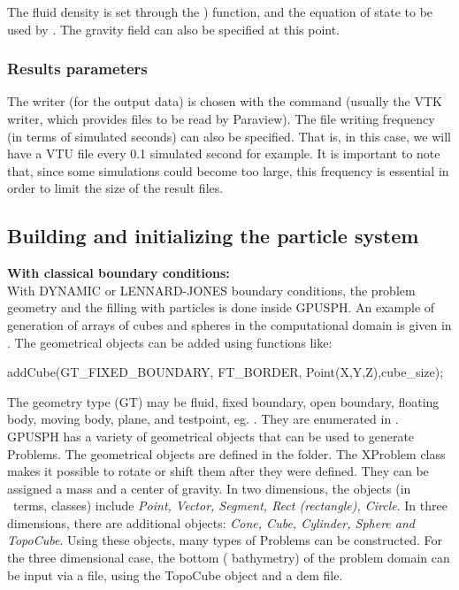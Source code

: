 The fluid density is set through the ) function,
and the equation of state to be used by .
The gravity field can also be specified at this point.
   
\subsubsection{Results parameters}

The writer (for the output data) is chosen with the 
command (usually the VTK writer, which provides files to be read by Paraview).  
The file writing frequency (in terms of simulated seconds) can also be specified. 
That is, in this case, we will have a VTU file every 0.1 simulated second for example. 
It is important to note that, since some simulations could become 
too large, this frequency is essential in order to limit the size of the result files.


\subsection{Building and initializing the particle system}

\textbf{With classical boundary conditions:}\\

With DYNAMIC or LENNARD-JONES boundary conditions, the
problem geometry and the filling with particles is done
inside GPUSPH. An example of generation of arrays
of cubes and spheres in the computational domain is given in
. 
The geometrical objects can be added using functions like:
\begin{ccode}
addCube(GT_FIXED_BOUNDARY, FT_BORDER,
             Point(X,Y,Z),cube_size);
\end{ccode}
The geometry type (GT) may be fluid, fixed boundary, open boundary, 
floating body, moving body, plane, and testpoint, eg. . 
They are enumerated in .\\


GPUSPH has a variety of geometrical objects that can be used to generate Problems.
The geometrical objects are defined in the  folder.
The XProblem class makes it possible to rotate or shift them after they were defined.
They can be assigned a mass and a center of gravity.
In two dimensions, the objects (in \cpp\ terms, classes) include {\em
Point, Vector, Segment, Rect (rectangle), Circle}. In three
dimensions, there are additional objects: {\em Cone, Cube, Cylinder,
Sphere and TopoCube}. Using these objects, many types of Problems can
be constructed. For the three dimensional case, the bottom (
bathymetry) of the problem domain can be input via a file, using the
TopoCube object and a dem file.


